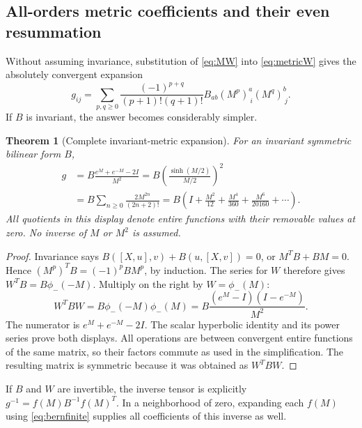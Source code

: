 \documentclass[11pt]{article}
\numberwithin{equation}{section}
\newtheorem{theorem}{Theorem}[section]
\theoremstyle{definition}
\theoremstyle{remark}
\begin{document}
\subsection{All-orders metric coefficients and their even resummation}
Without assuming invariance, substitution of \eqref{eq:MW} into
\eqref{eq:metricW} gives the absolutely convergent expansion
\begin{equation}\label{eq:metricdouble}
 g_{ij}=\sum_{p,q\geq0}\frac{(-1)^{p+q}}{(p+1)!(q+1)!}
 B_{ab}(M^p)^a_{\ i}(M^q)^b_{\ j}.
\end{equation}
If $B$ is invariant, the answer becomes considerably simpler.

\begin{theorem}[Complete invariant-metric expansion]\label{thm:metric}
For an invariant symmetric bilinear form $B$,
\begin{align}
 g&=B\frac{e^M+e^{-M}-2I}{M^2}
   =B\left(\frac{\sinh(M/2)}{M/2}\right)^2
       \label{eq:metricclosed}\\
  &=B\sum_{n\geq0}\frac{2M^{2n}}{(2n+2)!}
   =B\left(I+\frac{M^2}{12}+\frac{M^4}{360}
             +\frac{M^6}{20160}+\cdots\right).
       \label{eq:metriceven}
\end{align}
All quotients in this display denote entire functions with their
removable values at zero. No inverse of $M$ or $M^2$ is assumed.
\end{theorem}
\begin{proof}
Invariance says $B([X,u],v)+B(u,[X,v])=0$, or
$M^TB+BM=0$. Hence $(M^p)^TB=(-1)^pBM^p$, by induction.
The series for $W$ therefore gives
$W^TB=B\phi_-(-M)$. Multiply on the right by $W=\phi_-(M)$:
\[
 W^TBW=B\phi_-(-M)\phi_-(M)
 =B\frac{(e^M-I)(I-e^{-M})}{M^2}.
\]
The numerator is $e^M+e^{-M}-2I$. The scalar hyperbolic identity
and its power series prove both displays. All operations are
between convergent entire functions of the same matrix, so their
factors commute as used in the simplification. The resulting
matrix is symmetric because it was obtained as $W^TBW$.
\end{proof}
If $B$ and $W$ are invertible, the inverse tensor is explicitly
$g^{-1}=f(M)B^{-1}f(M)^T$. In a neighborhood of zero, expanding
each $f(M)$ using \eqref{eq:bernfinite} supplies all coefficients
of this inverse as well.
\end{document}

